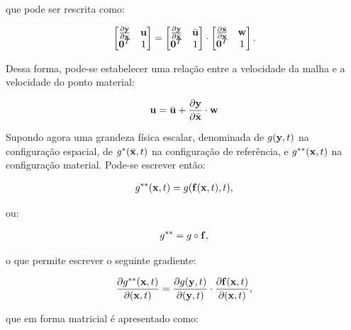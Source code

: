 \documentclass[tese_patricia]{subfiles}%
\begin{document}
\noindent que pode ser rescrita como:

\begin{align}
	\begin{bmatrix}
		\frac{\partial {\mathbf{y}}}{\partial {\mathbf{x}}} & \mathbf{u} \\
		\mathbf{0}^T & 1 \\
	\end{bmatrix}
	=
	\begin{bmatrix}
		\frac{\partial {\mathbf{y}}}{\partial {\bar{\mathbf{x}}}} & \bar{\mathbf{u}} \\
		\mathbf{0}^T & 1 \\
	\end{bmatrix}
	\cdot
	\begin{bmatrix}
		\frac{\partial {\bar{\mathbf{x}}}}{\partial {\mathbf{x}}} & \mathbf{w} \\
		\mathbf{0}^T & 1 \\
	\end{bmatrix} .
\end{align}

Dessa forma, pode-se estabelecer uma relação entre a velocidade da malha e a velocidade do ponto material:

\begin{align}
	\mathbf{u} = \bar{\mathbf{u}} + \frac{\partial{\mathbf{y}}}{\partial{\bar{\mathbf{x}}}}\cdot \mathbf{w} \label{eq:vel_rel_mat_ALE}
\end{align}

Supondo agora uma grandeza física escalar, denominada de $g(\mathbf{y},t)$ na configuração espacial, de $g^{*}(\bar{\mathbf{x}},t)$ na configuração de referência, e $g^{**}(\mathbf{x},t)$ na configuração material. Pode-se escrever então:

\begin{align}
	g^{**}(\mathbf{x},t) = g(\mathbf{f}(\mathbf{x},t),t), 
\end{align}

\noindent ou:

\begin{align}
	g^{**} = g  \circ \mathbf{f},
\end{align}

\noindent o que permite escrever o seguinte gradiente:

\begin{align}
	\frac{\partial g^{**}(\mathbf{x},t)}{\partial (\mathbf{x},t)} = \frac{\partial g(\mathbf{y},t)}{\partial (\mathbf{y},t)} \cdot \frac{\partial \mathbf{f}(\mathbf{x},t)}{\partial (\mathbf{x},t)},
\end{align}

\noindent que em forma matricial é apresentado como:
\end{document}
